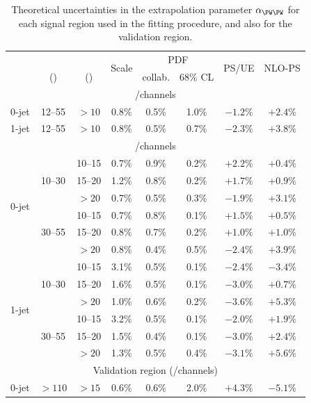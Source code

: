 \begin{table}[t]
	\centering
	\begin{tabular}{ccc|ccccc}
		\toprule
		& \mll & \ptsubleadlep & \multirow{2}{*}{Scale} & \multicolumn{2}{c}{PDF} & \multirow{2}{*}{PS/UE} & \multirow{2}{*}{NLO-PS} \\
		& (\GeV) & (\GeV) & & collab. & 68\% CL & & \\
		\midrule
		\multicolumn{8}{c}{\eech/\mmch channels} \\
		\midrule
		0-jet & 12--55 & $>10$ & 0.8\% & 0.5\% & 1.0\% & $-1.2\%$ & $+2.4\%$ \\
		1-jet & 12--55 & $>10$ & 0.8\% & 0.5\% & 0.7\% & $-2.3\%$ & $+3.8\%$ \\
		\midrule
		\multicolumn{8}{c}{\emch/\mech channels} \\
		\midrule
		\multirow{6}{*}{0-jet}
		& \multirow{3}{*}{10--30}
	    &  10--15 & 0.7\% & 0.9\% & 0.2\% & $+2.2\%$ & $+0.4\%$ \\
		&& 15--20 & 1.2\% & 0.8\% & 0.2\% & $+1.7\%$ & $+0.9\%$ \\
		&&  $>20$ & 0.7\% & 0.5\% & 0.3\% & $-1.9\%$ & $+3.1\%$ \\
		\cmidrule(lr){2-8}
		& \multirow{3}{*}{30--55}
		&  10--15 & 0.7\% & 0.8\% & 0.1\% & $+1.5\%$ & $+0.5\%$ \\
		&& 15--20 & 0.8\% & 0.7\% & 0.2\% & $+1.0\%$ & $+1.0\%$ \\
		&&  $>20$ & 0.8\% & 0.4\% & 0.5\% & $-2.4\%$ & $+3.9\%$ \\
		\cmidrule(lr){1-8}
		\multirow{6}{*}{1-jet}
		& \multirow{3}{*}{10--30}
	    &  10--15 & 3.1\% & 0.5\% & 0.1\% & $-2.4\%$ & $-3.4\%$ \\
		&& 15--20 & 1.6\% & 0.5\% & 0.1\% & $-3.0\%$ & $+0.7\%$ \\
		&&  $>20$ & 1.0\% & 0.6\% & 0.2\% & $-3.6\%$ & $+5.3\%$ \\
		\cmidrule(lr){2-8}
		& \multirow{3}{*}{30--55}
		&  10--15 & 3.2\% & 0.5\% & 0.1\% & $-2.0\%$ & $+1.9\%$ \\
		&& 15--20 & 1.5\% & 0.4\% & 0.1\% & $-3.0\%$ & $+2.4\%$ \\
		&&  $>20$ & 1.3\% & 0.5\% & 0.4\% & $-3.1\%$ & $+5.6\%$ \\
		\midrule
		\multicolumn{8}{c}{Validation region (\emch/\mech channels)} \\
		\midrule
		0-jet & $>110$ & $>15$ & 0.6\% & 0.6\% & 2.0\% & $+4.3\%$ & $-5.1\%$ \\
		\bottomrule
	\end{tabular}
	\caption{Theoretical uncertainties in the \WW extrapolation parameter $\alpha_{\WW}$ 
	for each signal region used in the fitting procedure, and also for the validation 
	region.}
	\label{tab:ww_bkg:alpha_unc}
\end{table}



